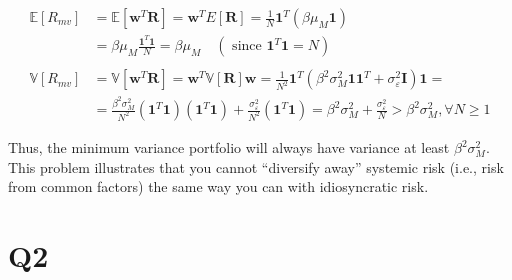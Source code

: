 \documentclass[
  oneside]{book}
\begin{document}
\[
\begin{aligned}
\mathbb{E}\left[R_{m v}\right] & =\mathbb{E}\left[\boldsymbol{w}^T \boldsymbol{R}\right]=\boldsymbol{w}^T E[\boldsymbol{R}]=\frac{1}{N} \mathbf{1}^T\left(\beta \mu_M \mathbf{1}\right) \\
& =\beta \mu_M \frac{\mathbf{1}^T \mathbf{1}}{N}=\beta \mu_M \quad\left(\text { since } \mathbf{1}^T \mathbf{1}=N\right) \\
\\
\mathbb{V}\left[R_{m v}\right] & =\mathbb{V}\left[\boldsymbol{w}^T \boldsymbol{R}\right]=\boldsymbol{w}^T \mathbb{V}[\boldsymbol{R}] \boldsymbol{w}=\frac{1}{N^2} \mathbf{1}^T\left(\beta^2 \sigma_M^2 \mathbf{1 1}^T+\sigma_{\varepsilon}^2 \boldsymbol{I}\right) \mathbf{1}= \\
& =\frac{\beta^2 \sigma_M^2}{N^2}\left(\mathbf{1}^T \mathbf{1}\right)\left(\mathbf{1}^T \mathbf{1}\right)+\frac{\sigma_{\varepsilon}^2}{N^2}\left(\mathbf{1}^T \mathbf{1}\right)=\beta^2 \sigma_M^2+\frac{\sigma_{\varepsilon}^2}{N}>\beta^2 \sigma_M^2, \forall N \geq 1
\end{aligned}
\]

Thus, the minimum variance portfolio will always have variance at least \(β^{2}\sigma_{M}^{2}\). This problem illustrates that you cannot ``diversify away'' systemic risk (i.e., risk from common factors) the same way you can with idiosyncratic risk.

\hypertarget{q2-3}{%
\section{Q2}\label{q2-3}}
\end{document}

